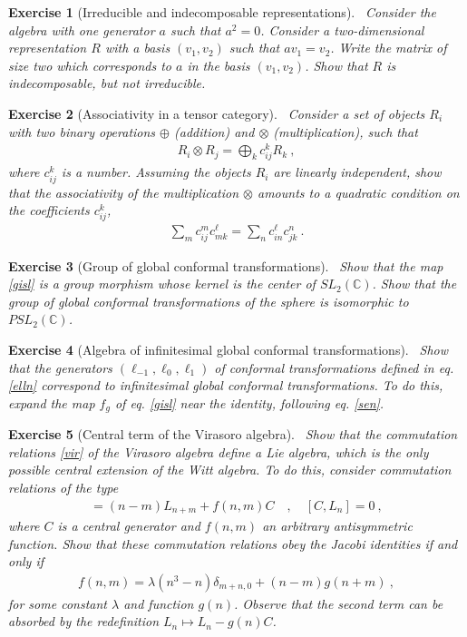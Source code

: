 \documentclass[12pt, a4paper, notitlepage, twoside]{report}
\numberwithin{equation}{section}
\theoremstyle{break}
\newtheorem{exo}{Exercise}[chapter]
\begin{document}
\begin{exo}[Irreducible and indecomposable representations] 
~\label{exoirr}
Consider the algebra with one generator $a$ such that $a^2 = 0$.
Consider a two-dimensional representation $R$ with a basis $(v_1,v_2)$ such that $av_1=v_2$.
Write the matrix of size two which corresponds to $a$ in the basis $(v_1,v_2)$.
Show that $R$ is indecomposable, but not irreducible. 
\end{exo}

\begin{exo}[Associativity in a tensor category]
 ~\label{exoten}
Consider a set of objects $R_i$ with two binary operations $\oplus$ (addition) and $\otimes$ (multiplication), such that 
\begin{align}
 R_i \otimes R_j = \bigoplus_k c_{ij}^k R_k\ ,
\end{align}
where $c_{ij}^k$ is a number.
Assuming the objects $R_i$ are linearly independent, show that the associativity of the multiplication $\otimes$ amounts to a quadratic condition on the coefficients $c_{ij}^k$,
\begin{align}
 \sum_m c_{ij}^m c_{mk}^\ell = \sum_n c_{in}^\ell c_{jk}^n\ .
\end{align}
\end{exo}

\begin{exo}[Group of global conformal transformations]
 ~\label{exoiso}
Show that the map \eqref{gisl} is a group morphism whose kernel is the center of $SL_2({\mathbb{C}})$.
Show that the group of global conformal transformations of the sphere is isomorphic to $PSL_2({\mathbb{C}})$. 
\end{exo}

\begin{exo}[Algebra of infinitesimal global conformal transformations]
 ~\label{exomoz}
Show that the generators $(\ell_{-1},\ell_0,\ell_1)$ of conformal transformations defined in eq. \eqref{elln} correspond to infinitesimal global conformal transformations.
To do this, expand the map $f_g$ of eq. \eqref{gisl} near the identity, following eq. \eqref{sen}.
\end{exo}


\begin{exo}[Central term of the Virasoro algebra]
~\label{exovir}
 Show that the commutation relations \eqref{vir} of the Virasoro algebra define a Lie algebra, which is the only possible central extension of the Witt algebra.
To do this, consider commutation relations of the type
\begin{align}
 [L_n,L_m] =(n-m)L_{n+m} + f(n,m) C  \quad , \quad [C,L_n]=0\ ,
\end{align}
where $C$ is a central generator and $f(n,m)$ an arbitrary antisymmetric function.
Show that these commutation relations obey the Jacobi identities if and only if 
\begin{align}
 f(n,m) = \lambda (n^3-n)\delta_{m+n,0} + (n-m)g(n+m)\ ,
\end{align}
for some constant $\lambda$ and function $g(n)$.
Observe that the second term can be absorbed by the redefinition $L_n\mapsto L_n-g(n)C$.
\end{exo}
\end{document}
